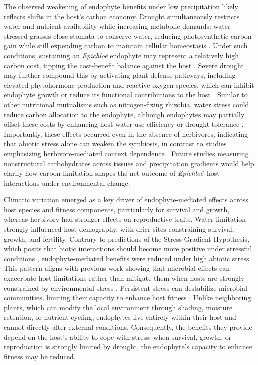 \documentclass[12pt]{article}\usepackage[]{graphicx}\usepackage[dvipsnames]{xcolor}
\begin{document}
The observed weakening of endophyte benefits under low precipitation likely reflects shifts in the host's carbon economy. 
Drought simultaneously restricts water and nutrient availability while increasing metabolic demands: water-stressed grasses close stomata to conserve water, reducing photosynthetic carbon gain while still expending carbon to maintain cellular homeostasis \citep{dietze2014nonstructural}. 
Under such conditions, sustaining an \textit{Epichloë} endophyte may represent a relatively high carbon cost, tipping the cost-benefit balance against the host \citep{ahlholm2002vertically, bronstein2001exploitation, faeth2002endophytic}. 
Severe drought may further compound this by activating plant defense pathways, including elevated phytohormone production and reactive oxygen species, which can inhibit endophyte growth or reduce its functional contributions to the host 
\citep{bastias2023plant, eaton2011triggers}. 
Similar to other nutritional mutualisms such as nitrogen-fixing rhizobia, water stress could reduce carbon allocation to the endophyte, although endophytes may partially offset these costs by enhancing host water-use efficiency or drought tolerance \citep{toby2010mutualisms, pringle2016integrating}. 
Importantly, these effects occurred even in the absence of herbivores, indicating that abiotic stress alone can weaken the symbiosis, in contrast to studies emphasizing herbivore-mediated context dependence 
\citep{bastias2017epichloe, afkhami2009endophyte}. 
Future studies measuring nonstructural carbohydrates across tissues and precipitation gradients would help clarify how carbon limitation shapes the net outcome of \textit{Epichloë}--host interactions under environmental change.

Climatic variation emerged as a key driver of endophyte‐mediated effects across host species and fitness components, particularly for survival and growth, whereas herbivory had stronger effects on reproductive traits. 
Water limitation strongly influenced host demography, with drier sites constraining survival, growth, and fertility. 
Contrary to predictions of the Stress Gradient Hypothesis, which posits that biotic interactions should become more positive under stressful conditions \citep{louthan2015and,lortie2006re}, endophyte-mediated benefits were reduced under high abiotic stress. 
This pattern aligns with previous work showing that microbial effects can exacerbate host limitations rather than mitigate them when hosts are strongly constrained by environmental stress \citep{david2018microbial}. 
Persistent stress can destabilize microbial communities, limiting their capacity to enhance host fitness \citep{hernandez2021environmental}. 
Unlike neighboring plants, which can modify the local environment through shading, moisture retention, or nutrient cycling, endophytes live entirely within their host and cannot directly alter external conditions. 
Consequently, the benefits they provide depend on the host’s ability to cope with stress: when survival, growth, or reproduction is strongly limited by drought, the endophyte’s capacity to enhance fitness may be reduced.
\end{document}
